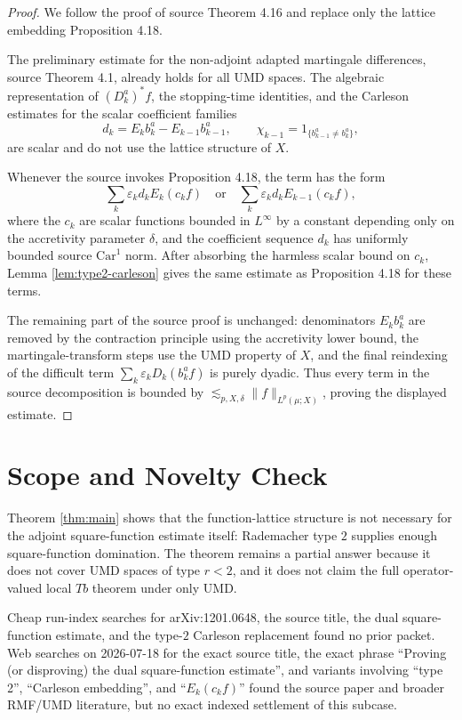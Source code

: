 \documentclass[11pt]{amsart}
\newcommand{\UMD}{\mathrm{UMD}}
\newcommand{\Car}{\mathrm{Car}}
\begin{document}
\begin{proof}
We follow the proof of source Theorem 4.16 and replace only the lattice
embedding Proposition 4.18.

The preliminary estimate for the non-adjoint adapted martingale differences,
source Theorem 4.1, already holds for all \(\UMD\) spaces.  The algebraic
representation of \((D_k^a)^*f\), the stopping-time identities, and the
Carleson estimates for the scalar coefficient families
\[
  d_k=E_kb_k^a-E_{k-1}b_{k-1}^a,\qquad
  \chi_{k-1}=1_{\{b_{k-1}^a\ne b_k^a\}},
\]
are scalar and do not use the lattice structure of \(X\).

Whenever the source invokes Proposition 4.18, the term has the form
\[
  \sum_k\varepsilon_k d_kE_k(c_k f)
  \quad\text{or}\quad
  \sum_k\varepsilon_k d_kE_{k-1}(c_k f),
\]
where the \(c_k\) are scalar functions bounded in \(L^\infty\) by a constant
depending only on the accretivity parameter \(\delta\), and the coefficient
sequence \(d_k\) has uniformly bounded source \(\Car^1\) norm.  After absorbing
the harmless scalar bound on \(c_k\), Lemma \ref{lem:type2-carleson} gives the
same estimate as Proposition 4.18 for these terms.

The remaining part of the source proof is unchanged: denominators
\(E_kb_k^a\) are removed by the contraction principle using the accretivity
lower bound, the martingale-transform steps use the \(\UMD\) property of
\(X\), and the final reindexing of the difficult term
\(\sum_k\varepsilon_kD_k(b_k^af)\) is purely dyadic.  Thus every term in the
source decomposition is bounded by
\(\lesssim_{p,X,\delta}\|f\|_{L^p(\mu;X)}\), proving the displayed estimate.
\end{proof}

\section*{Scope and Novelty Check}

Theorem \ref{thm:main} shows that the function-lattice structure is not
necessary for the adjoint square-function estimate itself: Rademacher type
\(2\) supplies enough square-function domination.  The theorem remains a
partial answer because it does not cover \(\UMD\) spaces of type \(r<2\), and
it does not claim the full operator-valued local \(Tb\) theorem under only
\(\UMD\).

Cheap run-index searches for arXiv:1201.0648, the source title, the dual
square-function estimate, and the type-\(2\) Carleson replacement found no
prior packet.  Web searches on 2026-07-18 for the exact source title, the
exact phrase ``Proving (or disproving) the dual square-function estimate'',
and variants involving ``type 2'', ``Carleson embedding'', and
``\(E_k(c_k f)\)'' found the source paper and broader RMF/UMD literature, but
no exact indexed settlement of this subcase.
\end{document}
